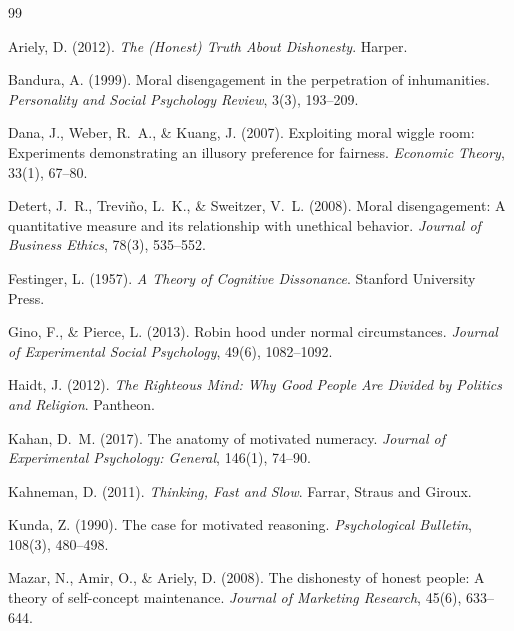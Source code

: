 \documentclass[11pt,a4paper]{article}
\begin{document}
\newpage

\begin{thebibliography}{99}

Ariely, D. (2012).
\newblock \emph{The (Honest) Truth About Dishonesty}.
\newblock Harper.

Bandura, A. (1999).
\newblock Moral disengagement in the perpetration of inhumanities.
\newblock \emph{Personality and Social Psychology Review}, 3(3), 193--209.

Dana, J., Weber, R.~A., \& Kuang, J. (2007).
\newblock Exploiting moral wiggle room: Experiments demonstrating an illusory
  preference for fairness.
\newblock \emph{Economic Theory}, 33(1), 67--80.

Detert, J.~R., Treviño, L.~K., \& Sweitzer, V.~L. (2008).
\newblock Moral disengagement: A quantitative measure and its relationship with
  unethical behavior.
\newblock \emph{Journal of Business Ethics}, 78(3), 535--552.

Festinger, L. (1957).
\newblock \emph{A Theory of Cognitive Dissonance}.
\newblock Stanford University Press.

Gino, F., \& Pierce, L. (2013).
\newblock Robin hood under normal circumstances.
\newblock \emph{Journal of Experimental Social Psychology}, 49(6), 1082--1092.

Haidt, J. (2012).
\newblock \emph{The Righteous Mind: Why Good People Are Divided by Politics and
  Religion}.
\newblock Pantheon.

Kahan, D.~M. (2017).
\newblock The anatomy of motivated numeracy.
\newblock \emph{Journal of Experimental Psychology: General}, 146(1), 74--90.

Kahneman, D. (2011).
\newblock \emph{Thinking, Fast and Slow}.
\newblock Farrar, Straus and Giroux.

Kunda, Z. (1990).
\newblock The case for motivated reasoning.
\newblock \emph{Psychological Bulletin}, 108(3), 480--498.

Mazar, N., Amir, O., \& Ariely, D. (2008).
\newblock The dishonesty of honest people: A theory of self-concept maintenance.
\newblock \emph{Journal of Marketing Research}, 45(6), 633--644.


\end{thebibliography}
\end{document}
